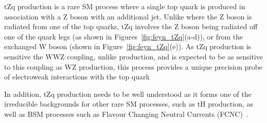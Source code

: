 tZq production is a rare SM process where a single top quark is produced in association with a Z boson with an additional jet.
Unlike \ttZ where the Z boson is radiated from one of the top quarks, tZq involves the Z boson being radiated off one of the quark legs (as shown in Figures~\ref{fig:feyn_tZq}(a-d)), or from the exchanged W boson (shown in Figure~\ref{fig:feyn_tZq}(e)).
As tZq production is sensitive the WWZ coupling, unlike \ttZ production, and is expected to be as sensitive to this coupling as WZ production, this process provides a unique precision probe of electroweak interactions with the top quark

In addition, tZq production needs to be well understood as it forms one of the irreducible backgrounds for other rare SM processes, such as tH production, as well as BSM processes such as Flavour Changing Neutral Currents (FCNC)~\cite{AguilarSaavedra:2004wm}.

